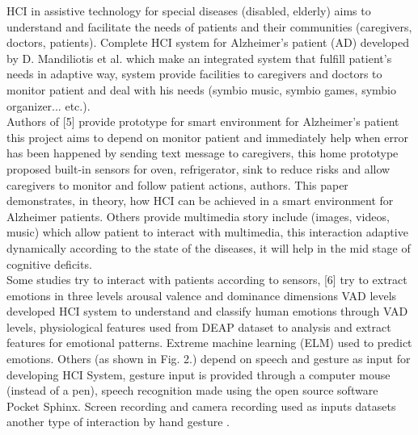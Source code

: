 HCI in assistive technology for special diseases (disabled, elderly) aims to understand and facilitate the needs of patients and their communities (caregivers, doctors, patients). Complete HCI system for Alzheimer’s patient (AD) developed by D. Mandiliotis et al. which make an integrated system that fulfill patient’s needs in adaptive way, system provide facilities to caregivers and doctors to monitor
patient and deal with his needs (symbio music, symbio games, symbio organizer... etc.).\\ Authors of [5] provide prototype for smart environment for Alzheimer’s patient this project aims to depend on monitor patient and immediately help when error has been happened by sending text message to caregivers, this home prototype proposed built-in sensors for oven, refrigerator, sink to reduce risks and allow caregivers to monitor and follow patient actions, authors. This paper demonstrates, in theory, how HCI can be achieved in a smart environment for Alzheimer patients. Others provide multimedia story include (images, videos, music) which allow patient to interact with multimedia, this interaction adaptive dynamically according to the state of the diseases, it will help in the mid stage of cognitive deficits.\\Some studies try to interact with patients according to sensors, [6] try to extract emotions in three levels arousal valence and dominance dimensions VAD levels developed HCI system to understand and classify human emotions through VAD levels, physiological features used from DEAP dataset to analysis and extract features for emotional patterns. Extreme machine learning (ELM) used to predict emotions. Others (as shown in Fig. 2.) depend on speech and gesture as input for developing HCI System, gesture input is provided through a computer mouse (instead of a pen), speech recognition made using the open source software Pocket Sphinx. Screen recording and camera recording used as inputs datasets another type of interaction by hand gesture .\\

